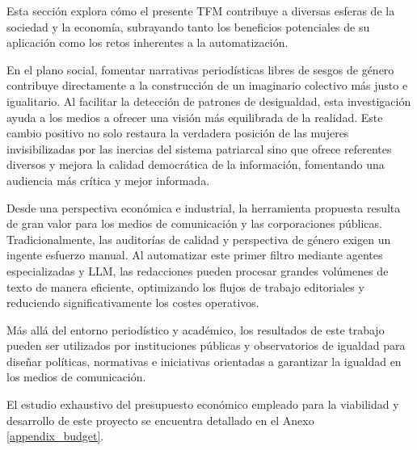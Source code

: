 
Esta sección explora cómo el presente TFM contribuye a diversas esferas de la sociedad y la economía, subrayando tanto los beneficios potenciales de su aplicación como los retos inherentes a la automatización.

En el plano social, fomentar narrativas periodísticas libres de sesgos de género contribuye directamente a la construcción de un imaginario colectivo más justo e igualitario. Al facilitar la detección de patrones de desigualdad, esta investigación ayuda a los medios a ofrecer una visión más equilibrada de la realidad. Este cambio positivo no solo restaura la verdadera posición de las mujeres invisibilizadas por las inercias del sistema patriarcal sino que ofrece  referentes diversos y mejora la calidad democrática de la información, fomentando una audiencia más crítica y mejor informada.

Desde una perspectiva económica e industrial, la herramienta propuesta resulta de gran valor para los medios de comunicación y las corporaciones públicas. Tradicionalmente, las auditorías de calidad y perspectiva de género exigen un ingente esfuerzo manual. Al automatizar este primer filtro mediante agentes especializadas y LLM, las redacciones pueden procesar grandes volúmenes de texto de manera eficiente, optimizando los flujos de trabajo editoriales y reduciendo significativamente los costes operativos.

Más allá del entorno periodístico y académico, los resultados de este trabajo pueden ser utilizados por instituciones públicas y observatorios de igualdad para diseñar políticas, normativas e iniciativas orientadas a garantizar la igualdad en los medios de comunicación.

El estudio exhaustivo del presupuesto económico empleado para la viabilidad y desarrollo de este proyecto se encuentra detallado en el Anexo \ref{appendix_budget}.

\newpage